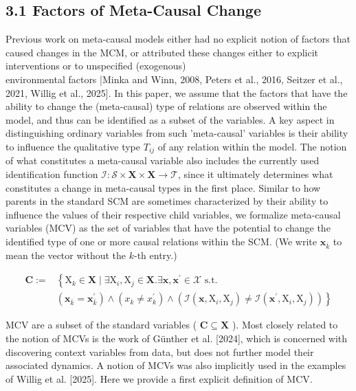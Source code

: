 \documentclass[10pt]{article}
\begin{document}
\subsection*{3.1 Factors of Meta-Causal Change}
Previous work on meta-causal models either had no explicit notion of factors that caused changes in the MCM, or attributed these changes either to explicit interventions or to unspecified (exogenous)\\[0pt]
environmental factors |Minka and Winn, 2008, Peters et al., 2016, Seitzer et al., 2021, Willig et al., 2025]. In this paper, we assume that the factors that have the ability to change the (meta-causal) type of relations are observed within the model, and thus can be identified as a subset of the variables. A key aspect in distinguishing ordinary variables from such 'meta-causal' variables is their ability to influence the qualitative type $T_{i j}$ of any relation within the model. The notion of what constitutes a meta-causal variable also includes the currently used identification function $\mathcal{I}: \mathcal{S} \times \mathbf{X} \times \mathbf{X} \rightarrow \mathcal{T}$, since it ultimately determines what constitutes a change in meta-causal types in the first place. Similar to how parents in the standard SCM are sometimes characterized by their ability to influence the values of their respective child variables, we formalize meta-causal variables (MCV) as the set of variables that have the potential to change the identified type of one or more causal relations within the SCM. (We write $\mathbf{x}_{\bar{k}}$ to mean the vector without the $k$-th entry.)


\begin{align*}
\mathbf{C}:= & \left\{\mathrm{X}_{k} \in \mathbf{X} \mid \exists \mathrm{X}_{i}, \mathrm{X}_{j} \in \mathbf{X} . \exists \mathbf{x}, \mathbf{x}^{\prime} \in \boldsymbol{\mathcal { X }}\right. \text { s.t. }  \tag{1}\\
& \left.\left(\mathbf{x}_{\bar{k}}=\mathbf{x}_{\bar{k}}^{\prime}\right) \wedge\left(x_{k} \neq x_{k}^{\prime}\right) \wedge\left(\mathcal{I}\left(\mathbf{x}, \mathrm{X}_{i}, \mathrm{X}_{j}\right) \neq \mathcal{I}\left(\mathbf{x}^{\prime}, \mathrm{X}_{i}, \mathrm{X}_{j}\right)\right)\right\}
\end{align*}


MCV are a subset of the standard variables ( $\mathbf{C} \subseteq \mathbf{X}$ ). Most closely related to the notion of MCVs is the work of Günther et al. [2024], which is concerned with discovering context variables from data, but does not further model their associated dynamics. A notion of MCVs was also implicitly used in the examples of Willig et al. [2025]. Here we provide a first explicit definition of MCV.
\end{document}
